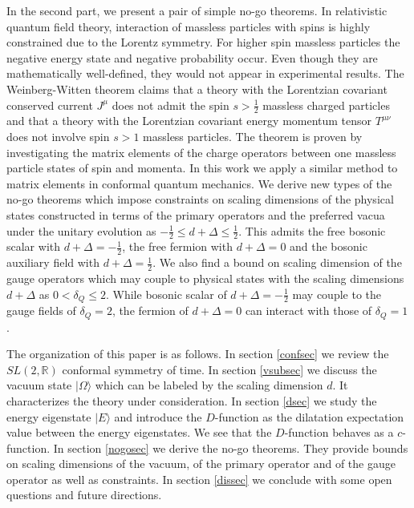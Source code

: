\documentclass[12pt]{article}
\numberwithin{equation}{section}
\begin{document}
In the second part, 
we present a pair of simple no-go theorems. 
In relativistic quantum field theory, 
interaction of massless particles with spins is highly constrained due to the Lorentz symmetry. 
For higher spin massless particles 
the negative energy state and negative probability occur. 
Even though they are mathematically well-defined, 
they would not appear in experimental results. 
The Weinberg-Witten theorem \cite{Weinberg:1980kq} 
claims that 
a theory with the Lorentzian covariant conserved current $J^{\mu}$ does not 
admit the spin $s>\frac12$ massless charged particles  
and that a theory with the Lorentzian covariant energy momentum tensor $T^{\mu\nu}$ 
does not involve spin $s>1$ massless particles. 
The theorem is proven by investigating the matrix elements 
of the charge operators between one massless particle states 
of spin and momenta. 
In this work we apply a similar method to matrix elements 
in conformal quantum mechanics. 
We derive new types of the no-go theorems 
which impose constraints on scaling dimensions 
of the physical states constructed in terms of the primary operators 
and the preferred vacua under the unitary evolution as 
$-\frac12 \le d+\Delta\le\frac12$. 
This admits the free bosonic scalar with $d+\Delta= -\frac12$, 
the free fermion with $d+\Delta=0$ 
and the bosonic auxiliary field with $d+\Delta=\frac12$. 
We also find a bound on scaling dimension of the gauge operators which may couple to 
physical states with the scaling dimensions $d+\Delta$ as 
$0<\delta_{Q}\le 2$. 
While bosonic scalar of $d+\Delta=-\frac12$ may couple to the gauge fields of $\delta_{Q}=2$, 
the fermion of $d+\Delta=0$ can interact with those of $\delta_{Q}=1$. 


The organization of this paper is as follows. 
In section \ref{confsec} 
we review the $SL(2,\mathbb{R})$ conformal symmetry of time. 
In section \ref{vsubsec} 
we discuss the vacuum state $|\Omega\rangle$ 
which can be labeled by the scaling dimension $d$. 
It characterizes the theory under consideration. 
In section \ref{dsec} 
we study the energy eigenstate $|E\rangle$ 
and introduce the $D$-function 
as the dilatation expectation value between the energy eigenstates. 
We see that the $D$-function behaves as a $c$-function. 
In section \ref{nogosec} 
we derive the no-go theorems. 
They provide bounds on scaling dimensions 
of the vacuum, of the primary operator 
and of the gauge operator as well as constraints. 
In section \ref{dissec} we conclude with some open questions and future directions. 
\end{document}
